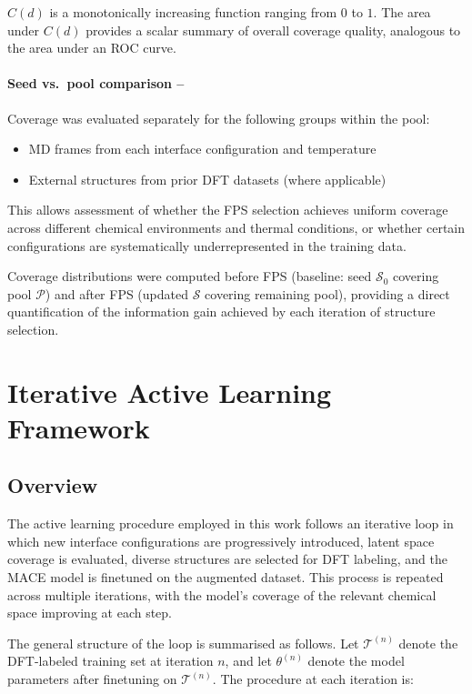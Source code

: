 \documentclass[12pt,a4paper,oneside]{book}
\begin{document}
$C(d)$ is a monotonically increasing function ranging from $0$ to $1$.
The area under $C(d)$ provides a scalar summary of overall coverage quality,
analogous to the area under an ROC curve.

\paragraph{Seed vs.\ pool comparison --}
Coverage was evaluated separately for the following groups within the pool:
\begin{itemize}
    \item MD frames from each interface configuration and temperature
    \item External structures from prior DFT datasets (where applicable)
\end{itemize}

This allows assessment of whether the FPS selection achieves uniform coverage
across different chemical environments and thermal conditions, or whether
certain configurations are systematically underrepresented in the training
data.

Coverage distributions were computed before FPS (baseline: seed $\mathcal{S}_0$
covering pool $\mathcal{P}$) and after FPS (updated $\mathcal{S}$ covering
remaining pool), providing a direct quantification of the information gain
achieved by each iteration of structure selection.

\section{Iterative Active Learning Framework}

\subsection{Overview}

The active learning procedure employed in this work follows an iterative
loop in which new interface configurations are progressively introduced,
latent space coverage is evaluated, diverse structures are selected for
DFT labeling, and the MACE model is finetuned on the augmented dataset.
This process is repeated across multiple iterations, with the model's
coverage of the relevant chemical space improving at each step.

The general structure of the loop is summarised as follows. Let $\mathcal{T}^{(n)}$
denote the DFT-labeled training set at iteration $n$, and let
$\theta^{(n)}$ denote the model parameters after finetuning on
$\mathcal{T}^{(n)}$. The procedure at each iteration is:
\end{document}
